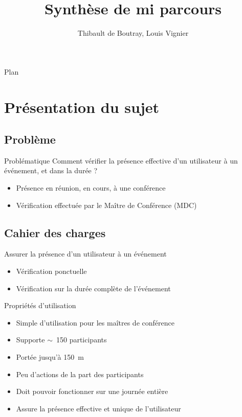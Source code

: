 \documentclass[aspectratio=169]{beamer}
\title{Synthèse de mi parcours}
\author{Thibault de Boutray, Louis Vignier}
\institute{CentraleSupélec}
\begin{document}
\begin{frame}
  \titlepage
\end{frame}

\begin{frame}{Plan}
  \tableofcontents
\end{frame}

\section{Présentation du sujet}

\subsection{Problème}

\begin{frame}{Problématique}
	Comment vérifier la présence effective d'un utilisateur à un événement, et dans la durée ?
	
	\bigskip
	
	\begin{itemize}
        \item Présence en réunion, en cours, à une conférence
        \item Vérification effectuée par le Maître de Conférence (MDC)
	\end{itemize}

\end{frame}

\subsection{Cahier des charges}

\begin{frame}{Assurer la présence d’un utilisateur à un événement}	
    \begin{itemize}
        \item Vérification ponctuelle\pause
        \item Vérification sur la durée complète de l'événement
    \end{itemize}
\end{frame}

\begin{frame}{Propriétés d'utilisation}
    \begin{itemize}
        \item Simple d’utilisation pour les maîtres de conférence\pause
        \item Supporte $\sim$~150 participants\pause
        \item Portée jusqu'à \SI{150}{\meter}\pause
        \item Peu d’actions de la part des participants\pause
        \item Doit pouvoir fonctionner sur une journée entière\pause
        \item Assure la présence effective et unique de l’utilisateur
    \end{itemize}
\end{frame}
\end{document}
